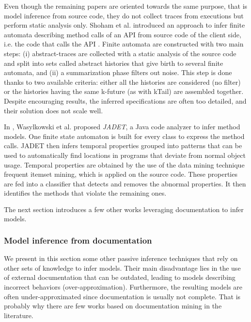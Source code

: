 Even though the remaining papers are oriented towards the same
purpose, that is model inference from source code, they do not
collect traces from executions but perform static analysis only.
Shoham et al. introduced an approach to infer finite automata
describing method calls of an API from source code of the client
side, i.e. the code that calls the API
\cite{Shoham:2007:SSM:1273463.1273487}. Finite automata are
constructed with two main steps: (i) abstract-traces are
collected with a static analysis of the source code and split
into sets called abstract histories that give birth to several
finite automata, and (ii) a summarization phase filters out
noise. This step is done thanks to two available criteria: either
all the histories are considered (no filter) or the histories
having the same k-future (as with kTail) are assembled together.
Despite encouraging results, the inferred specifications are
often too detailed, and their solution does not scale well.

In \cite{Wasylkowski07detectingobject}, Wasylkowski et al.
proposed \textit{JADET}, a Java code analyzer to infer method
models. One finite state automaton is built for every class to
express the method calls. JADET then infers temporal properties
grouped into patterns that can be used to automatically find
locations in programs that deviate from normal object usage.
Temporal properties are obtained by the use of the data mining
technique frequent itemset mining, which is applied on the source
code. These properties are fed into a classifier that detects and
removes the abnormal properties. It then identifies the methods
that violate the remaining ones.

The next section introduces a few other works leveraging
documentation to infer models.

\subsubsection{Model inference from documentation}
\label{sec:passive-others}

We present in this section some other passive inference
techniques that rely on other sets of knowledge to infer models.
Their main disadvantage lies in the use of external documentation
that can be outdated, leading to models describing incorrect
behaviors (over-approximation). Furthermore, the resulting models
are often under-approximated since documentation is usually not
complete. That is probably why there are few works based on
documentation mining in the literature.

